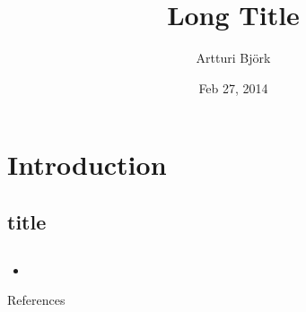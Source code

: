 \documentclass{beamer}					%
\title[Short Title]{Long Title}
\author[Björk]{Artturi Björk}
\institute[Aalto]{Aalto University}
\date{Feb 27, 2014}
\begin{document}
\section{Introduction}
	\subsection{title}
		\begin{frame}[plain]
			\titlepage
		\end{frame}

	\subsection{}
		\begin{frame}{}
			\begin{itemize}
            	\item
			\end{itemize}
		\end{frame}
    

		
 \begin{frame}{References}
\printbibliography
\end{frame}
\end{document}
